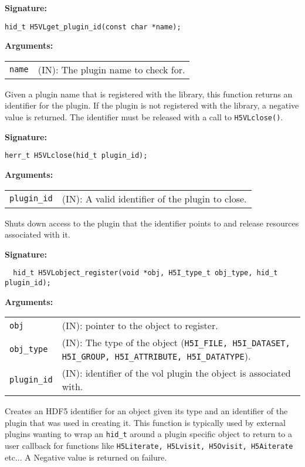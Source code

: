 \begin{mdframed}[style=bgbox]
\textbf{Signature:}
\begin{lstlisting}
hid_t H5VLget_plugin_id(const char *name);
\end{lstlisting}
\textbf{Arguments:}\\
\begin{tabular}{l p{10cm}}
  {\tt name} & (IN): The plugin name to check for.\\
\end{tabular}
\end{mdframed}
Given a plugin name that is registered with the library, this function returns an identifier for the plugin. If the plugin is not registered with the library, a negative value is returned. The identifier must be released with a call to {\tt H5VLclose()}.\bigskip


\begin{mdframed}[style=bgbox]
\textbf{Signature:}
\begin{lstlisting}
herr_t H5VLclose(hid_t plugin_id);
\end{lstlisting}

\textbf{Arguments:}\\
\begin{tabular}{l p{10cm}}
 {\tt plugin\_id} & (IN): A valid identifier of the plugin to close.\\
\end{tabular}
\end{mdframed}
Shuts down access to the plugin that the identifier points to and release resources associated with it.\bigskip


\begin{mdframed}[style=bgbox]
\textbf{Signature:}
\begin{lstlisting}
  hid_t H5VLobject_register(void *obj, H5I_type_t obj_type, hid_t plugin_id);
\end{lstlisting}

\textbf{Arguments:}\\
\begin{tabular}{l p{10cm}}
 {\tt obj} & (IN): pointer to the object to register.\\
 {\tt obj\_type} & (IN): The type of the object ({\tt H5I\_FILE, H5I\_DATASET, H5I\_GROUP, H5I\_ATTRIBUTE, H5I\_DATATYPE}).\\
 {\tt plugin\_id} & (IN): identifier of the vol plugin the object is associated with.\\
\end{tabular}
\end{mdframed}
Creates an HDF5 identifier for an object given its type and an identifier of the plugin that was used in creating it. This function is typically used by external plugins wanting to wrap an {\tt hid\_t} around a plugin specific object to return to a user callback for functions like {\tt H5Literate, H5Lvisit, H5Ovisit, H5Aiterate} etc... A Negative value is returned on failure.\bigskip

